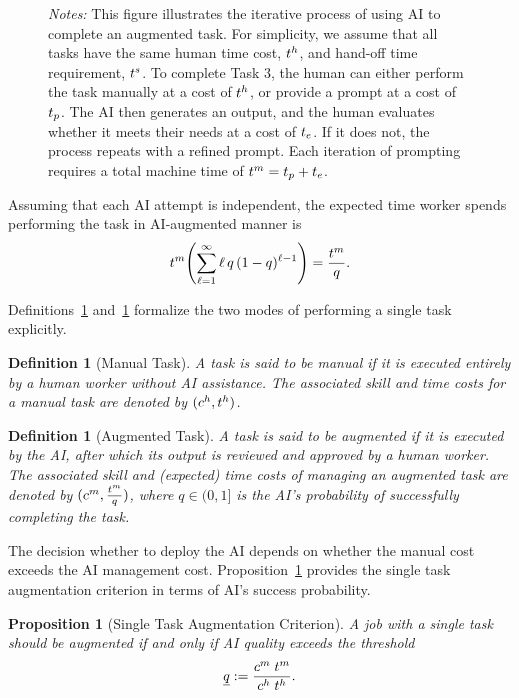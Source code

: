 \documentclass{article}
\theoremstyle{plain}
\theoremstyle{plain}
\newtheorem{proposition}[theorem]{Proposition}
\newtheorem{definition}[theorem]{Definition}
\begin{document}
\begin{figure}[h!]
\begin{center}
{\begin{tikzpicture}[node distance=1.8cm]
\end{tikzpicture}}
   \end{center}
  \footnotesize{
  \emph{Notes:} This figure illustrates the iterative process of using AI to complete an augmented task.  
  For simplicity, we assume that all tasks have the same human time cost, $\humantime{}$, and hand-off time requirement, $\handofftime{}$.  
  To complete Task 3, the human can either perform the task manually at a cost of $\humantime{}$, or provide a prompt at a cost of $\timecost{p}$. 
  The AI then generates an output, and the human evaluates whether it meets their needs at a cost of $\timecost{e}$.  
  If it does not, the process repeats with a refined prompt.  
  Each iteration of prompting requires a total machine time of $\machinetime{} = \timecost{p} + \timecost{e}$.}
\end{figure}
Assuming that each AI attempt is independent, the expected time worker spends performing the task in AI-augmented manner is
$$\machinetime{} \Biggl( \sum_{\ell=1}^{\infty} \ell\,q\,(1 - q)^{\ell - 1} \Biggr) = \frac{\machinetime{}}{q}.$$

Definitions~\ref{def:manual_task} and~\ref{def:augmented_task} formalize the two modes of performing a single task explicitly.

\begin{definition}[Manual Task]
\label{def:manual_task}
A task is said to be manual if it is executed entirely by a human worker without AI assistance.
The associated skill and time costs for a manual task are denoted by $(\humanhc{}, \humantime{})$.
\end{definition}

\begin{definition}[Augmented Task]
\label{def:augmented_task}
A task is said to be augmented if it is executed by the AI, after which its output is reviewed and approved by a human worker.
The associated skill and (expected) time costs of managing an augmented task are denoted by $(\machinehc{}, \frac{\machinetime{}}{q})$, where $q \in (0,1]$ is the AI's probability of successfully completing the task.
\end{definition}

The decision whether to deploy the AI depends on whether the manual cost exceeds the AI management cost.
Proposition~\ref{prop:single} provides the single task augmentation criterion in terms of AI's success probability.

\begin{proposition}[Single Task Augmentation Criterion] 
\label{prop:single}
A job with a single task should be augmented if and only if AI quality exceeds the threshold
$$\underline{q} := \frac{\machinehc{} \; \machinetime{}}{\humanhc{} \; \humantime{}}.$$
\end{proposition}
\end{document}
